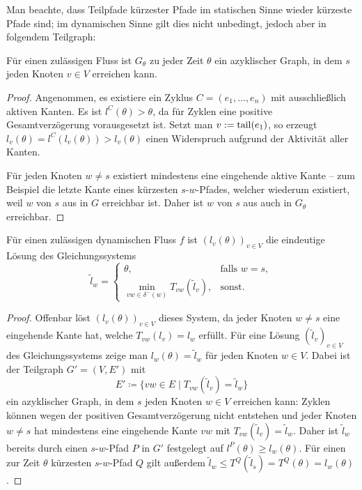 Man beachte, dass Teilpfade kürzester Pfade im statischen Sinne wieder kürzeste Pfade sind; im dynamischen Sinne gilt dies nicht unbedingt, jedoch aber in folgendem Teilgraph:

\begin{lemma}\label{lemma-shortest-path-using-active-edges}
	Für einen zulässigen Fluss ist $G_\theta$ zu jeder Zeit $\theta$ ein azyklischer Graph, in dem $s$ jeden Knoten $v\in V$ erreichen kann.
\end{lemma}
\begin{proof}
	Angenommen, es existiere ein Zyklus $C=(e_1, \dots, e_n)$ mit ausschließlich aktiven Kanten.
	Es ist $l^C(\theta) > \theta$, da für Zyklen eine positive Gesamtverzögerung vorausgesetzt ist.
	Setzt man $v:= \operatorname{tail}(e_1)$, so erzeugt $l_{v}(\theta) = l^C(l_{v}(\theta)) > l_{v}(\theta)$ einen Widerspruch aufgrund der Aktivität aller Kanten.
	
	Für jeden Knoten $w\neq s$ existiert mindestens eine eingehende aktive Kante -- zum Beispiel die letzte Kante eines kürzesten $s$-$w$-Pfades, welcher wiederum existiert, weil $w$ von $s$ aus in $G$ erreichbar ist.
	Daher ist $w$ von $s$ aus auch in $G_\theta$ erreichbar.
\end{proof}

\begin{proposition}\label{prop-arrival-times-vector}
	Für einen zulässigen dynamischen Fluss $f$ ist $(l_v(\theta))_{v\in V}$ die eindeutige Lösung des Gleichungssystems
	\[ \tilde{l}_w = \begin{cases}
	\theta, & \text{falls } w=s, \\
	\min\limits_{vw\in \delta^-(w)} T_{vw}(\tilde{l}_v), & \text{sonst}.
	\end{cases} \]
\end{proposition}
\begin{proof}
	Offenbar löst $(l_v(\theta))_{v\in V}$ dieses System, da jeder Knoten $w\neq s$ eine eingehende Kante hat, welche $T_{vw}(l_v) = l_w$ erfüllt.
	Für eine Lösung $(\tilde{l}_v)_{v\in V}$ des Gleichungssystems zeige man $l_w(\theta) = \tilde{l}_w$ für jeden Knoten $w\in V$.
	Dabei ist der Teilgraph $G'=(V, E')$ mit
	\[ E' \coloneq  \{ vw \in E \mid T_{vw}(\tilde{l}_v ) = \tilde{l}_w \} \]
	ein azyklischer Graph, in dem $s$ jeden Knoten $w\in V$ erreichen kann:
	Zyklen können wegen der positiven Gesamtverzögerung nicht entstehen und jeder Knoten $w\neq s$ hat mindestens eine eingehende Kante $vw$ mit $T_{vw}(\tilde{l}_v) = \tilde{l}_w$.
	Daher ist $\tilde{l}_w$ bereits durch einen $s$-$w$-Pfad $P$ in $G'$ festgelegt auf $l^P(\theta)\geq l_w(\theta)$.
	Für einen zur Zeit $\theta$ kürzesten $s$-$w$-Pfad $Q$ gilt außerdem $\tilde{l}_w \leq T^Q(\tilde{l}_s) = T^Q(\theta) = l_w(\theta)$.
\end{proof}

